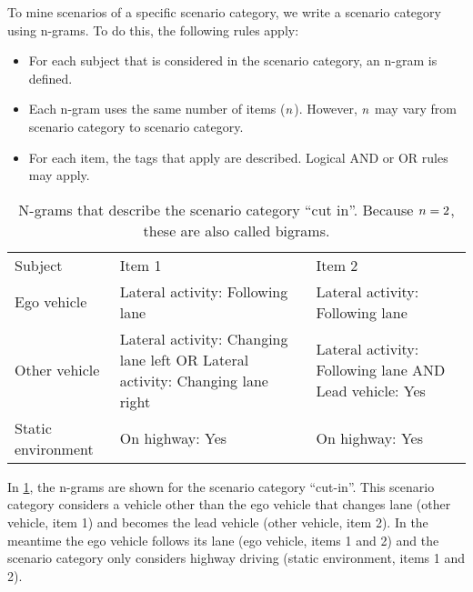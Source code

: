 To mine scenarios of a specific scenario category, we write a scenario category using n-grams. 
To do this, the following rules apply:
\begin{itemize}
	\item For each subject that is considered in the scenario category, an n-gram is defined.
	\item Each n-gram uses the same number of items ($n$). However, $n$ may vary from scenario category to scenario category.
	\item For each item, the tags that apply are described. Logical AND or OR rules may apply.
\end{itemize}

\begin{table}
	\centering
	\caption{\cstartb N-grams that describe the scenario category ``cut in''. Because $n=2$, these are also called bigrams.\cendb}
	\label{tab:ngrams cutin}
	\cstartb
	\begin{tabularx}{\linewidth}{lXX}
		\toprule
		Subject & Item 1 & Item 2 \\ \otoprule
		Ego vehicle & Lateral activity: \newline Following lane & Lateral activity: \newline Following lane \\
		Other vehicle & Lateral activity: \newline Changing lane left OR \newline Lateral activity: \newline Changing lane right & Lateral activity: \newline Following lane AND \newline Lead vehicle: Yes \\
		Static environment & On highway: Yes & On highway: Yes \\
		\bottomrule
	\end{tabularx}
	\cendb
\end{table}

In \cref{tab:ngrams cutin}, the n-grams are shown for the scenario category ``cut-in''. 
This scenario category considers a vehicle other than the ego vehicle that changes lane (other vehicle, item 1) and becomes the lead vehicle (other vehicle, item 2). 
In the meantime the ego vehicle follows its lane (ego vehicle, items 1 and 2) and the scenario category only considers highway driving (static environment, items 1 and 2).

